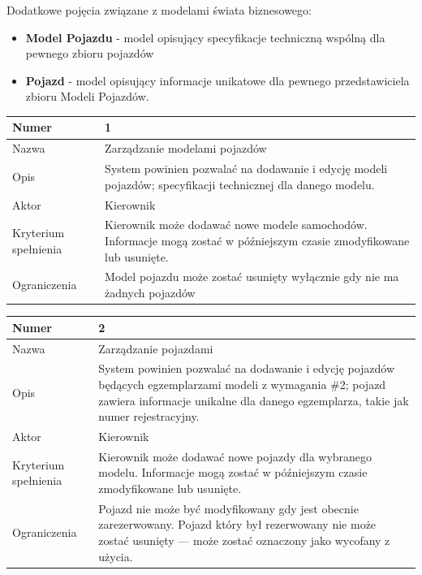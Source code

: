 \documentclass[eng,printmode,openany]{mgr}
\begin{document}
	Dodatkowe pojęcia związane z modelami świata biznesowego:
	\begin{itemize}
		\item \textbf{Model Pojazdu} - model opisujący specyfikacje techniczną wspólną dla pewnego zbioru pojazdów
		\item \textbf{Pojazd} - model opisujący informacje unikatowe dla pewnego przedstawiciela zbioru Modeli Pojazdów.
	\end{itemize}
	
	\begin{table}[H]
		\begin{tabularx}{\textwidth}{|l|X|}
			\hline
			Numer                & 1  \\ \hline
			Nazwa                & Zarządzanie modelami pojazdów \\ \hline
			Opis                 & System powinien pozwalać na dodawanie i edycję modeli pojazdów; specyfikacji technicznej dla danego modelu.    \\ \hline
			Aktor                & Kierownik \\ \hline
			Kryterium spełnienia & Kierownik może dodawać nowe modele samochodów. Informacje mogą zostać w późniejszym czasie zmodyfikowane lub usunięte.\\ \hline
			Ograniczenia         & Model pojazdu może zostać usunięty wyłącznie gdy nie ma żadnych pojazdów \\ \hline
		\end{tabularx}
	\end{table}
	
	\begin{table}[H]
		\begin{tabularx}{\textwidth}{|l|X|}
			\hline
			Numer                & 2 \\ \hline
			Nazwa                & Zarządzanie pojazdami \\ \hline
			Opis                 & System powinien pozwalać na dodawanie i edycję pojazdów będących egzemplarzami modeli z wymagania \#2; pojazd zawiera informacje unikalne dla danego egzemplarza, takie jak numer rejestracyjny.     \\ \hline
			Aktor                & Kierownik \\ \hline
			Kryterium spełnienia & Kierownik może dodawać nowe pojazdy dla wybranego modelu. Informacje mogą zostać w późniejszym czasie zmodyfikowane lub usunięte.\\ \hline
			Ograniczenia         & Pojazd nie może być modyfikowany gdy jest obecnie zarezerwowany. Pojazd który był rezerwowany nie może zostać usunięty — może zostać oznaczony jako wycofany z użycia. \\ \hline
		\end{tabularx}
	\end{table}
	
\end{document}
